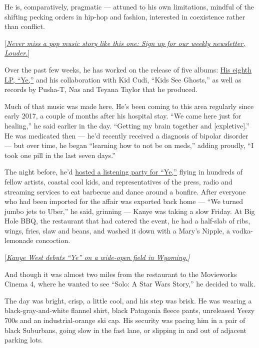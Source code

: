 He is, comparatively, pragmatic --- attuned to his own limitations,
mindful of the shifting pecking orders in hip-hop and fashion,
interested in coexistence rather than conflict.

{[}\href{https://www.nytimes3xbfgragh.onion/newsletters/louder}{\emph{Never
miss a pop music story like this one: Sign up for our weekly newsletter,
Louder.}}{]}

Over the past few weeks, he has worked on the release of five albums:
\href{https://www.nytimes3xbfgragh.onion/2018/06/03/arts/music/kanye-west-ye-review.html}{His
eighth LP, ``Ye,''} and his collaboration with Kid Cudi, ``Kids See
Ghosts,'' as well as records by Pusha-T, Nas and Teyana Taylor that he
produced.

Much of that music was made here. He's been coming to this area
regularly since early 2017, a couple of months after his hospital stay.
``We came here just for healing,'' he said earlier in the day. ``Getting
my brain together and {[}expletive{]}.'' He was medicated then --- he'd
recently received a diagnosis of bipolar disorder --- but over time, he
began ``learning how to not be on meds,'' adding proudly, ``I took one
pill in the last seven days.''

The night before, he'd
\href{https://www.nytimes3xbfgragh.onion/2018/06/01/arts/music/kanye-west-album-ye.html}{hosted
a listening party for ``Ye,''} flying in hundreds of fellow artists,
coastal cool kids, and representatives of the press, radio and streaming
services to eat barbecue and dance around a bonfire. After everyone who
had been imported for the affair was exported back home --- ``We turned
jumbo jets to Uber,'' he said, grinning --- Kanye was taking a slow
Friday. At Big Hole BBQ, the restaurant that had catered the event, he
had a half-slab of ribs, wings, fries, slaw and beans, and washed it
down with a Mary's Nipple, a vodka-lemonade concoction.

{[}\href{https://www.nytimes3xbfgragh.onion/2018/06/01/arts/music/kanye-west-album-ye.html?action=click\&module=Intentional\&pgtype=Article}{\emph{Kanye
West debuts ``Ye'' on a wide-open field in Wyoming.}}\emph{{]}}

And though it was almost two miles from the restaurant to the Movieworks
Cinema 4, where he wanted to see ``Solo: A Star Wars Story,'' he decided
to walk.

The day was bright, crisp, a little cool, and his step was brisk. He was
wearing a black-gray-and-white flannel shirt, black Patagonia fleece
pants, unreleased Yeezy 700s and an industrial-orange ski cap. His
security was pacing him in a pair of black Suburbans, going slow in the
fast lane, or slipping in and out of adjacent parking lots.

